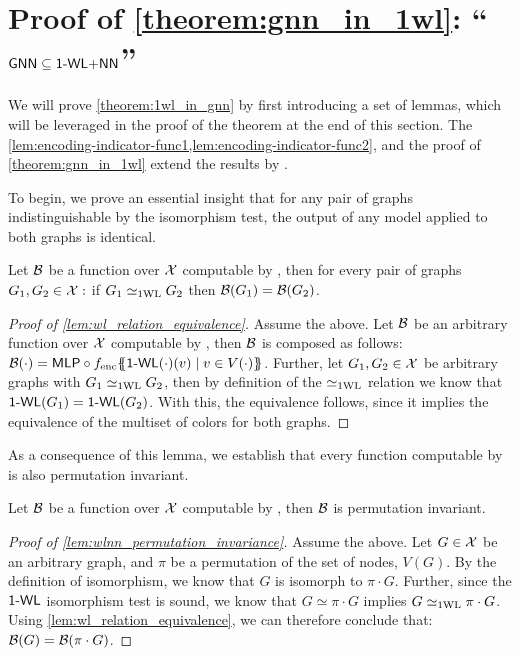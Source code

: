\section{Proof of \cref*{theorem:gnn_in_1wl}: ``$\textsf{GNN} \subseteq \text{\textsf{1-WL+NN}}$''}\label{sec:proof_theorem:1wl_in_gnn}
We will prove \cref{theorem:1wl_in_gnn} by first introducing a set of lemmas, which will be leveraged in the proof of the theorem at the end of this section. The \cref{lem:encoding-indicator-func1,lem:encoding-indicator-func2}, and the proof of \cref{theorem:gnn_in_1wl} extend the results by \cite{Chen2019}.

To begin, we prove an essential insight that for any pair of graphs indistinguishable by the \wl isomorphism test, the output of any \wlnn model applied to both graphs is identical.
\begin{lemma}\label{lem:wl_relation_equivalence}
    Let $\mathcal{B}$ be a function over $\mathcal{X}$ computable by \wlnn, then for every pair of graphs $G_1, G_2 \in \mathcal{X}:$ if $G_1 \simeq_{\text{1WL}} G_2$ then $\mathcal{B}(G_1) = \mathcal{B}(G_2)$.
\end{lemma}
\begin{proof}[Proof of \cref{lem:wl_relation_equivalence}]
    Assume the above. Let $\mathcal{B}$ be an arbitrary function over $\mathcal{X}$ computable by \wlnn, then $\mathcal{B}$ is composed as follows: $\mathcal{B}(\cdot) = \textsf{MLP} \circ f_{\text{enc}} \{\!\!\{ \textsf{1-WL}(\cdot)(v) \mid v \in V(\cdot) \}\!\!\}$. Further, let $G_1, G_2 \in \mathcal{X}$ be arbitrary graphs with $G_1 \simeq_{\text{1WL}} G_2$, then by definition of the $\simeq_{\text{1WL}}$ relation we know that $\textsf{1-WL}(G_1) = \textsf{1-WL}(G_2)$. With this, the equivalence follows, since it implies the equivalence of the multiset of colors for both graphs.
\end{proof}

As a consequence of this lemma, we establish that every function computable by \wlnn is also permutation invariant.
\begin{lemma}\label{lem:wlnn_permutation_invariance}
    Let $\mathcal{B}$ be a function over $\mathcal{X}$ computable by \wlnn, then $\mathcal{B}$ is permutation invariant.
\end{lemma}

\begin{proof}[Proof of \cref{lem:wlnn_permutation_invariance}]
    Assume the above. Let $G \in \mathcal{X}$ be an arbitrary graph, and $\pi$ be a permutation of the set of nodes, $V(G)$. By the definition of isomorphism, we know that $G$ is isomorph to $\pi \cdot G$. Further, since the $\textsf{1-WL}$ isomorphism test is sound, we know that $G \simeq \pi \cdot G$ implies $G \simeq_{\text{1WL}} \pi \cdot G$. Using \cref{lem:wl_relation_equivalence}, we can therefore conclude that: $\mathcal{B}(G) = \mathcal{B}(\pi \cdot G)$.
\end{proof}

